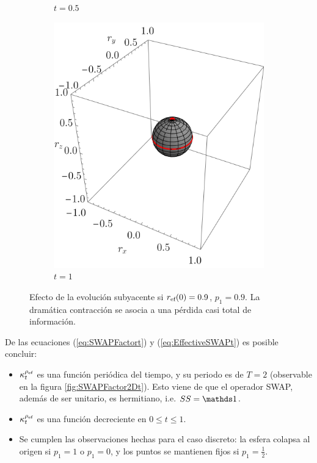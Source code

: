 \begin{figure}[ht!]
\begin{subfigure}{0.32\textwidth}
    \caption{$t=0.5$}
  \end{subfigure}
  \begin{subfigure}{0.32\textwidth}
    \centering
    \includegraphics[width=0.9\linewidth]{chapter3/figures_toy/SWAP_t=1._p=0.9_r=0.9.png}
    \caption{$t=1$}
  \end{subfigure}
  \caption{Efecto de la evolución subyacente si $r_{\text{ef}}(0)=0.9$, $p_{1}=0.9$. La dramática contracción se asocia a una pérdida casi total de información.}
  \label{fig:SWAPFactorSequence}
  \end{figure}

De las ecuaciones (\ref{eq:SWAPFactort}) y (\ref{eq:EffectiveSWAPt}) es posible concluir:
\begin{itemize}
  \item $\kappa_{t}^{\rho_{\text{ef}}}$ es una función periódica del tiempo, y su periodo es de $T=2$ (observable en la figura \ref{fig:SWAPFactor2Dt}). Esto viene de que el operador SWAP, además de ser unitario, es hermitiano, i.e. $SS=\Id$.
  \item $\kappa_{t}^{\rho_{\text{ef}}}$ es una función decreciente en $0\leq t\leq 1$.
  \item Se cumplen las observaciones hechas para el caso discreto: la esfera colapsa al origen si $p_{1}=1$ o $p_{1}=0$, y los puntos se mantienen fijos si $p_{1}=\frac{1}{2}$.
\end{itemize}

